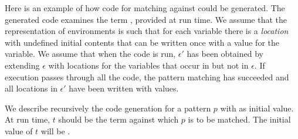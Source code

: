 Here is an example of how code for matching  against 
could be generated.  The generated code examines the term ,
provided at run time.  We assume that the representation of
environments is such that for each variable there is a \emph{location}
with undefined initial contents that can be written once with a value
for the variable.  We assume that when the code is run, $\epsilon'$
has been obtained by extending $\epsilon$ with locations for the
variables that occur in  but not in $\epsilon$.  If execution
passes through all the code, the pattern matching has succeeded and
all locations in $\epsilon'$ have been written with values.

We describe recursively the code generation for a pattern $p$ with
 as initial value.  At run time, $t$ should be the term against
which $p$ is to be matched.  The initial value of $t$ will be .

